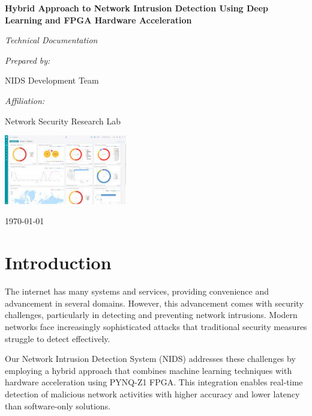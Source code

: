 \documentclass[12pt]{article}
\begin{document}
\begin{titlepage}
  \centering
  \vspace*{1cm}
  {\Huge\bfseries Hybrid Approach to Network Intrusion Detection Using Deep Learning and FPGA Hardware Acceleration\par}
  \vspace{1.5cm}
  {\Large\itshape Technical Documentation\par}
  \vspace{2.5cm}
  {\large\itshape Prepared by:\par}
  \vspace{0.5cm}
  {\large NIDS Development Team\par}
  \vspace{1.5cm}
  {\large\itshape Affiliation:\par}
  \vspace{0.5cm}
  {\large Network Security Research Lab\par}
  \vspace{1.5cm}
  \includegraphics[width=0.4\textwidth]{attached_assets/images.jpeg}\par
  \vspace{1.5cm}
  {\large \today\par}
\end{titlepage}

\tableofcontents
\pagebreak

\section{Introduction}
The internet has many systems and services, providing convenience and advancement in several domains. However, this advancement comes with security challenges, particularly in detecting and preventing network intrusions. Modern networks face increasingly sophisticated attacks that traditional security measures struggle to detect effectively.

Our Network Intrusion Detection System (NIDS) addresses these challenges by employing a hybrid approach that combines machine learning techniques with hardware acceleration using PYNQ-Z1 FPGA. This integration enables real-time detection of malicious network activities with higher accuracy and lower latency than software-only solutions.
\end{document}
